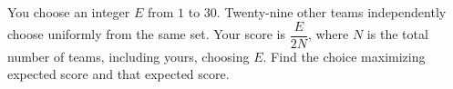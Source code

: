 You choose an integer $E$ from $1$ to $30$. Twenty-nine other teams independently choose uniformly from the same set. Your score is $\dfrac{E}{2N}$, where $N$ is the total number of teams, including yours, choosing $E$. Find the choice maximizing expected score and that expected score.
